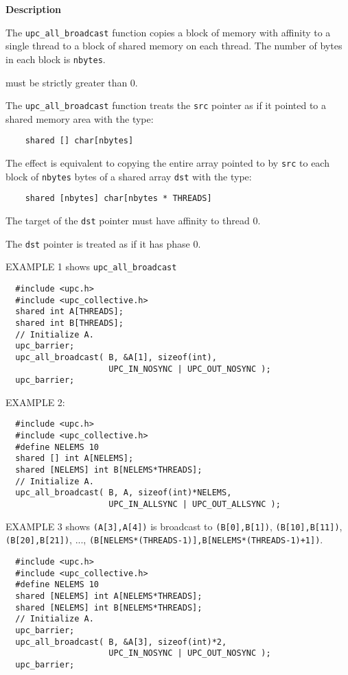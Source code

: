 {\bf Description} 

\np The {\tt upc\_all\_broadcast} function copies a block of memory with
affinity to a single thread to a block of shared memory on each thread.
The number of bytes in each block is {\tt nbytes}.

 must be strictly greater than 0.

\np The {\tt upc\_all\_broadcast} function treats the {\tt src} pointer
as if it pointed to a shared memory area with the type:

\begin{verbatim}
    shared [] char[nbytes]
\end{verbatim}  

\np The effect is equivalent to copying the entire array pointed to by
{\tt src} to each block of {\tt nbytes} bytes of a shared
array {\tt dst} with the type:

\begin{verbatim}
    shared [nbytes] char[nbytes * THREADS]
\end{verbatim}  

\np The target of the {\tt dst} pointer must have affinity to
thread 0.

\np The {\tt dst} pointer is treated as if it has phase 0.

\np EXAMPLE 1 shows {\tt upc\_all\_broadcast}
\begin{verbatim}
  #include <upc.h>
  #include <upc_collective.h>
  shared int A[THREADS];
  shared int B[THREADS];
  // Initialize A.
  upc_barrier;
  upc_all_broadcast( B, &A[1], sizeof(int),
                     UPC_IN_NOSYNC | UPC_OUT_NOSYNC );
  upc_barrier;
\end{verbatim}

\np EXAMPLE 2:
\begin{verbatim}
  #include <upc.h>
  #include <upc_collective.h>
  #define NELEMS 10
  shared [] int A[NELEMS];
  shared [NELEMS] int B[NELEMS*THREADS];
  // Initialize A.
  upc_all_broadcast( B, A, sizeof(int)*NELEMS,
                     UPC_IN_ALLSYNC | UPC_OUT_ALLSYNC );
\end{verbatim}

\np EXAMPLE 3 shows {\tt (A[3],A[4])} is broadcast to
{\tt (B[0],B[1])}, {\tt (B[10],B[11])}, \\
{\tt (B[20],B[21])}, ..., 
{\tt (B[NELEMS*(THREADS-1)],B[NELEMS*(THREADS-1)+1])}.
\begin{verbatim}
  #include <upc.h>
  #include <upc_collective.h>
  #define NELEMS 10
  shared [NELEMS] int A[NELEMS*THREADS];
  shared [NELEMS] int B[NELEMS*THREADS];
  // Initialize A.
  upc_barrier;
  upc_all_broadcast( B, &A[3], sizeof(int)*2,
                     UPC_IN_NOSYNC | UPC_OUT_NOSYNC );
  upc_barrier;
\end{verbatim}

